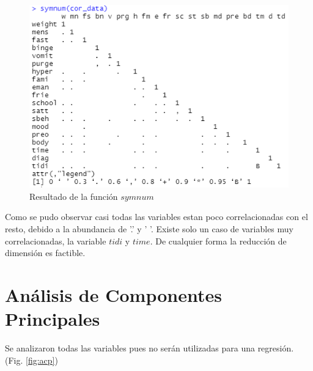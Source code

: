 \documentclass[a4paper,10pt,twocolumn]{article}
\begin{document}
	
	\begin{figure}[htb]%
		\begin{center}
			\includegraphics[width=\linewidth]{symnum}
		\end{center}
		\caption{Resultado de la función $symnum$ \label{fig:symnum}}%
	\end{figure}
	
	
	Como se pudo observar casi todas las variables estan poco correlacionadas con el resto, debido a la abundancia de '.'  y  ' '. Existe solo un caso de variables muy correlacionadas, la variable $tidi$ y $time$. De cualquier forma la reducción de dimensión es factible.
	
	\section{Análisis de Componentes Principales}\label{sec:acp}
	
	
	Se analizaron todas las variables pues no serán utilizadas para una regresión. (Fig. \ref{fig:acp})
	
	
\end{document}
